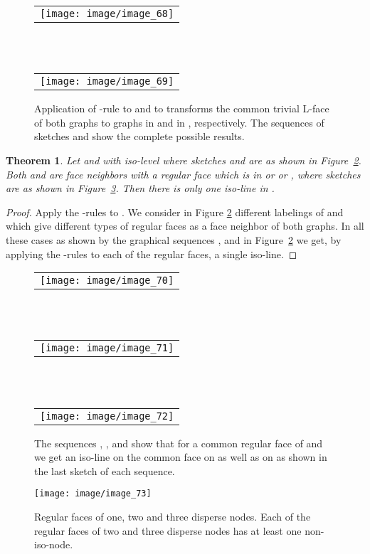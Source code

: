 \documentclass[a4paper,11pt]{article}
\newtheorem{theorem}{Theorem}[section]
\begin{document}
\begin{figure}[!ht]
\noindent 
\begin{tabular}[c]{l}
\texttt{[image: image/image\_68]}
\end{tabular}
\\ \\

\noindent 
\begin{tabular}[c]{l}
\texttt{[image: image/image\_69]}
\end{tabular}
\caption{Application of -rule to  and to 
transforms the common trivial L-face of both graphs to graphs in  and in ,
respectively. The sequences of sketches  and  show the complete possible results.}
\label{image_68_69}
\end{figure}
\FloatBarrier
\begin{theorem}\label{thm:connect-2}
Let  and  with iso-level  where sketches  and  are as
shown in Figure~\ref{image_70_71_72}. Both  and  are face neighbors with a regular
face  which is in  or  or
, where sketches  are as shown in Figure~\ref{image_73}.
Then there is only one iso-line in .
\end{theorem}
\begin{proof} Apply the -rules to . We consider in Figure \ref{image_70_71_72} different
labelings of  and  which give different types of regular faces as a face neighbor
of both graphs. In all these cases as shown by the graphical sequences ,  and  in
Figure~\ref{image_70_71_72} we get, by applying the -rules to each of the regular faces,
a single iso-line.
\end{proof}
\begin{figure}[!ht]
\noindent 
\begin{tabular}[c]{l}
\texttt{[image: image/image\_70]}
\end{tabular}
\\ \\

\noindent 
\begin{tabular}[c]{l}
\texttt{[image: image/image\_71]}
\end{tabular}
\\ \\

\noindent 
\begin{tabular}[c]{l}
\texttt{[image: image/image\_72]}
\end{tabular}
\caption{The sequences , , and  show that for a common regular face of
 and  we get an iso-line
on the common face on  as well as on  as shown in the last sketch of each sequence.}
\label{image_70_71_72}
\end{figure}
\begin{figure}[!ht]
\texttt{[image: image/image\_73]}
\caption{Regular faces of one, two and three disperse nodes. Each of the regular faces of
two and three disperse nodes has at least one non-iso-node.}
\label{image_73}
\end{figure}
\FloatBarrier
\end{document}
